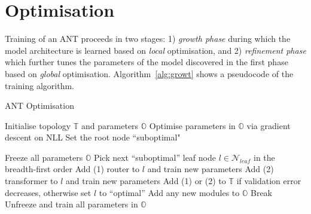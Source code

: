 \section{Optimisation}\label{sec:learning}
Training of an ANT proceeds in two stages: 1) \textit{growth phase} during which the model architecture is learned based on \textit{local} optimisation, and 2) \textit{refinement phase} which further tunes the parameters of the model discovered in the first phase based on \textit{global} optimisation. Algorithm~\ref{alg:growt} shows a pseudocode of the training algorithm.

\begin{algorithm}
	\caption{ANT Optimisation}
	\label{alg:growth}
	\footnotesize
	\begin{algorithmic}
		\State Initialise topology $\mathbb{T}$ and parameters $\mathbb{O}$
		\State Optimise parameters in $\mathbb{O}$ via gradient descent on NLL 
		\State Set the root node ``suboptimal"
		
		 
		\State Freeze all parameters $\mathbb{O}$
		\State Pick next ``suboptimal'' leaf node $l\in\mathcal{N}_{leaf}$ in the breadth-first order
		\State Add (1) router to $l$ and train new parameters 
		\State Add (2) transformer to $l$ and train new parameters
		\State Add (1) or (2) to $\mathbb{T}$ if validation error decreases, otherwise set $l$ to ``optimal''
		\State Add any new modules to $\mathbb{O}$ 
		\State Break
		\EndIf
		\EndWhile
		\State Unfreeze and train all parameters in $\mathbb{O}$
	\end{algorithmic}
\end{algorithm}


